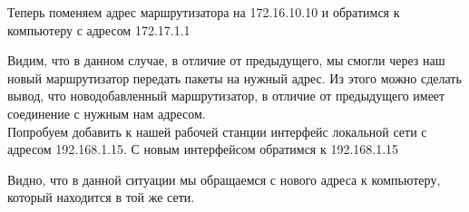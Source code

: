 \documentclass[a4paper,12pt]{article}
\begin{document}
Теперь поменяем адрес маршрутизатора на 172.16.10.10 и обратимся к 
компьютеру с адресом 172.17.1.1
\begin{figure}[H]
\end{figure}
Видим, что в данном случае, в отличие от предыдущего, мы смогли через наш новый маршрутизатор
передать пакеты на нужный адрес. Из этого можно сделать вывод, что новодобавленный маршрутизатор, 
в отличие от предыдущего имеет соединение с нужным нам адресом.\\

Попробуем добавить к нашей рабочей станции интерфейс локальной сети
с адресом 192.168.1.15. С новым интерфейсом обратимся к 192.168.1.15
\begin{figure}[H]
\end{figure}
Видно, что в данной ситуации мы обращаемся с нового адреса к компьютеру, 
который находится в той же сети.\\
\end{document}
